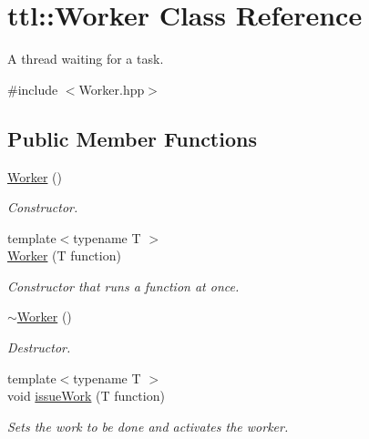 \hypertarget{classttl_1_1_worker}{\section{ttl\-:\-:Worker Class Reference}
\label{classttl_1_1_worker}
}


A thread waiting for a task.  




{\ttfamily \#include $<$Worker.\-hpp$>$}

\subsection*{Public Member Functions}
\begin{DoxyCompactItemize}
\item 
\hypertarget{classttl_1_1_worker_ac51b9144f87cabf06f14a2203b389d84}{\hyperlink{classttl_1_1_worker_ac51b9144f87cabf06f14a2203b389d84}{Worker} ()}\label{classttl_1_1_worker_ac51b9144f87cabf06f14a2203b389d84}

\begin{DoxyCompactList}\small\item\em Constructor. \end{DoxyCompactList}\item 
\hypertarget{classttl_1_1_worker_aaad3014c1838b2b32d4f93a9e5bed3bf}{{\footnotesize template$<$typename T $>$ }\\\hyperlink{classttl_1_1_worker_aaad3014c1838b2b32d4f93a9e5bed3bf}{Worker} (T function)}\label{classttl_1_1_worker_aaad3014c1838b2b32d4f93a9e5bed3bf}

\begin{DoxyCompactList}\small\item\em Constructor that runs a function at once. \end{DoxyCompactList}\item 
\hypertarget{classttl_1_1_worker_a5f3fe46cd15c9db99fc604e6647191f7}{\hyperlink{classttl_1_1_worker_a5f3fe46cd15c9db99fc604e6647191f7}{$\sim$\-Worker} ()}\label{classttl_1_1_worker_a5f3fe46cd15c9db99fc604e6647191f7}

\begin{DoxyCompactList}\small\item\em Destructor. \end{DoxyCompactList}\item 
{\footnotesize template$<$typename T $>$ }\\void \hyperlink{classttl_1_1_worker_ab081f96e637aa01d82b22b50264aa09a}{issue\-Work} (T function)
\begin{DoxyCompactList}\small\item\em Sets the work to be done and activates the worker. \end{DoxyCompactList}\end{DoxyCompactItemize}


